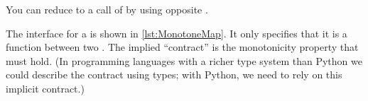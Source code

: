 
\begin{widepar}
\end{widepar}

\begin{hint}
    You can reduce  to a call of  by using opposite .
\end{hint}


    The interface for a  is shown in \cref{lst:MonotoneMap}.
    It only specifies that it is a function between two .
    The implied ``contract'' is the monotonicity property that must hold.
    (In programming languages with a richer type system than Python we could describe the contract using types; with Python, we need to rely on this implicit contract.)


